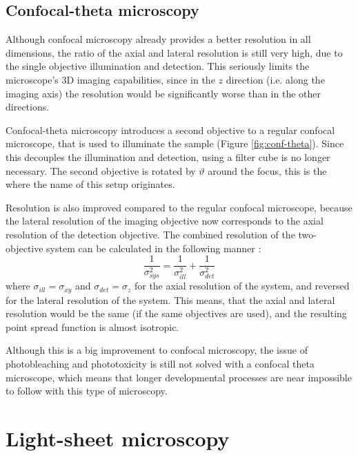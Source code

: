 \documentclass{diploma_style}
\begin{document}
\subsection{Confocal-theta microscopy}

Although confocal microscopy already provides a better resolution in all dimensions, the ratio of the axial and lateral resolution is still very high, due to the single objective illumination and detection. This seriously limits the microscope's 3D imaging capabilities, since in the $z$ direction (i.e. along the imaging axis) the resolution would be significantly worse than in the other directions.

Confocal-theta microscopy \cite{stelzer_fundamental_1994} introduces a second objective to a regular confocal microscope, that is used to illuminate the sample (Figure \ref{fig:conf-theta}). Since this decouples the illumination and detection, using a filter cube is no longer necessary. The second objective is rotated by $\vartheta$ around the focus, this is the where the name of this setup originates.

Resolution is also improved compared to the regular confocal microscope, because the lateral resolution of the imaging objective now corresponds to the axial resolution of the detection objective. The combined resolution of the two-objective system can be calculated in the following manner \cite{krzic_multiple-view_2009}:
\begin{equation}
\frac{1}{\sigma _{sys}^2} = \frac{1}{\sigma _{ill}^2} + \frac{1}{\sigma _{det}^2}
\end{equation}
where $\sigma_{ill} = \sigma_{xy}$ and $\sigma_{det} = \sigma_z$ for the axial resolution of the system, and reversed for the lateral resolution of the system. This means, that the axial and lateral resolution would be the same (if the same objectives are used), and the resulting point spread function is almost isotropic.

Although this is a big improvement to confocal microscopy, the issue of photobleaching and phototoxicity is still not solved with a confocal theta microscope, which means that longer developmental processes are near impossible to follow with this type of microscopy.




\section{Light-sheet microscopy}
\label{sec:light-sheet}
\end{document}

